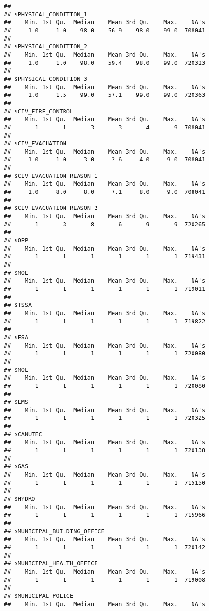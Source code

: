 \documentclass[]{article}
\begin{document}
\begin{verbatim}
## 
## $PHYSICAL_CONDITION_1
##    Min. 1st Qu.  Median    Mean 3rd Qu.    Max.    NA's 
##     1.0     1.0    98.0    56.9    98.0    99.0  708041 
## 
## $PHYSICAL_CONDITION_2
##    Min. 1st Qu.  Median    Mean 3rd Qu.    Max.    NA's 
##     1.0     1.0    98.0    59.4    98.0    99.0  720323 
## 
## $PHYSICAL_CONDITION_3
##    Min. 1st Qu.  Median    Mean 3rd Qu.    Max.    NA's 
##     1.0     1.5    99.0    57.1    99.0    99.0  720363 
## 
## $CIV_FIRE_CONTROL
##    Min. 1st Qu.  Median    Mean 3rd Qu.    Max.    NA's 
##       1       1       3       3       4       9  708041 
## 
## $CIV_EVACUATION
##    Min. 1st Qu.  Median    Mean 3rd Qu.    Max.    NA's 
##     1.0     1.0     3.0     2.6     4.0     9.0  708041 
## 
## $CIV_EVACUATION_REASON_1
##    Min. 1st Qu.  Median    Mean 3rd Qu.    Max.    NA's 
##     1.0     8.0     8.0     7.1     8.0     9.0  708041 
## 
## $CIV_EVACUATION_REASON_2
##    Min. 1st Qu.  Median    Mean 3rd Qu.    Max.    NA's 
##       1       3       8       6       9       9  720265 
## 
## $OPP
##    Min. 1st Qu.  Median    Mean 3rd Qu.    Max.    NA's 
##       1       1       1       1       1       1  719431 
## 
## $MOE
##    Min. 1st Qu.  Median    Mean 3rd Qu.    Max.    NA's 
##       1       1       1       1       1       1  719011 
## 
## $TSSA
##    Min. 1st Qu.  Median    Mean 3rd Qu.    Max.    NA's 
##       1       1       1       1       1       1  719822 
## 
## $ESA
##    Min. 1st Qu.  Median    Mean 3rd Qu.    Max.    NA's 
##       1       1       1       1       1       1  720080 
## 
## $MOL
##    Min. 1st Qu.  Median    Mean 3rd Qu.    Max.    NA's 
##       1       1       1       1       1       1  720080 
## 
## $EMS
##    Min. 1st Qu.  Median    Mean 3rd Qu.    Max.    NA's 
##       1       1       1       1       1       1  720325 
## 
## $CANUTEC
##    Min. 1st Qu.  Median    Mean 3rd Qu.    Max.    NA's 
##       1       1       1       1       1       1  720138 
## 
## $GAS
##    Min. 1st Qu.  Median    Mean 3rd Qu.    Max.    NA's 
##       1       1       1       1       1       1  715150 
## 
## $HYDRO
##    Min. 1st Qu.  Median    Mean 3rd Qu.    Max.    NA's 
##       1       1       1       1       1       1  715966 
## 
## $MUNICIPAL_BUILDING_OFFICE
##    Min. 1st Qu.  Median    Mean 3rd Qu.    Max.    NA's 
##       1       1       1       1       1       1  720142 
## 
## $MUNICIPAL_HEALTH_OFFICE
##    Min. 1st Qu.  Median    Mean 3rd Qu.    Max.    NA's 
##       1       1       1       1       1       1  719008 
## 
## $MUNICIPAL_POLICE
##    Min. 1st Qu.  Median    Mean 3rd Qu.    Max.    NA's 

\end{verbatim}
\end{document}
